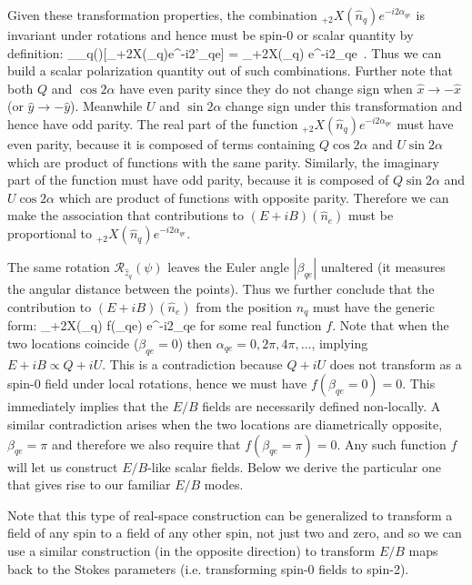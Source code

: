 Given these transformation properties, the combination ${}_{+2}X(\hat{n}_q)e^{-i2\alpha_{qe}}$ is invariant under rotations and hence must be spin-0 or scalar quantity by definition:
\beq
{}_{_q}(\psi)[{}_{+2}X(_q)e^{-i2\alpha'_{qe}}] = {}_{+2}X(_q) e^{-i2\alpha_{qe}} \,. \label{eq:invariant}
\eeq
Thus we can build a scalar polarization quantity out of such combinations.
Further note that both $Q$ and $\cos2 \alpha$ have even parity since they do not change sign when $\hat{x} \rightarrow -\hat{x}$ (or $\hat{y} \rightarrow -\hat{y}$).  Meanwhile $U$ and $\sin 2 \alpha$ change sign under this transformation and hence have odd parity. The real part of the function  ${}_{+2}X(\hat{n}_q)e^{-i2\alpha_{qe}}$ must have even parity, because it is composed of terms containing $Q\cos{2\alpha}$ and  $U\sin{2 \alpha}$ which are product of functions with the same parity. Similarly, the imaginary part of the function must have odd parity, because it is composed of $Q\sin{2 \alpha}$ and $U\cos{2\alpha}$ which are product of functions with opposite parity.  Therefore we can make the association that contributions to  $(E+iB)(\hat n_e)$ must be proportional to $ {}_{+2}X(\hat{n}_q) e^{-i2\alpha_{qe}}$.


The same rotation $\mathcal{R}_{\hat{z}_q}(\psi)$ leaves the Euler angle $|\beta_{qe}|$ unaltered (it measures the angular distance between the points).  Thus we further conclude that the contribution to $(E+iB)(\hat n_e)$ from the position $n_q$ must have the generic form:
\beq
{}_{+2}X(_q) f(\beta_{qe})  e^{-i2\alpha_{qe}}
\eeq
for some real function $f$.  Note that when the two locations coincide ($\beta_{qe}=0$) then  $\alpha_{qe}=0,2\pi,4\pi,\dots$, implying $E + iB \propto Q+iU$.  This is a contradiction because $Q+iU$ does not transform as a spin-0 field under local rotations, hence we must have $f(\beta_{qe} = 0 ) = 0$. This immediately implies that the $E/B$ fields are necessarily defined non-locally.  A similar contradiction arises when the two locations are diametrically opposite, $\beta_{qe} = \pi$ and therefore we also require that $f(\beta_{qe} = \pi ) = 0$.  Any such function $f$ will let us construct $E/B$-like scalar fields.  Below we derive the particular one that gives rise to our familiar $E/B$ modes.

Note that this type of real-space construction can be generalized to transform a field of any spin to a field of any other spin, not just two and zero, and so we can use a similar construction (in the opposite direction) to transform $E/B$ maps back to the Stokes parameters (i.e. transforming spin-0 fields to spin-2).


